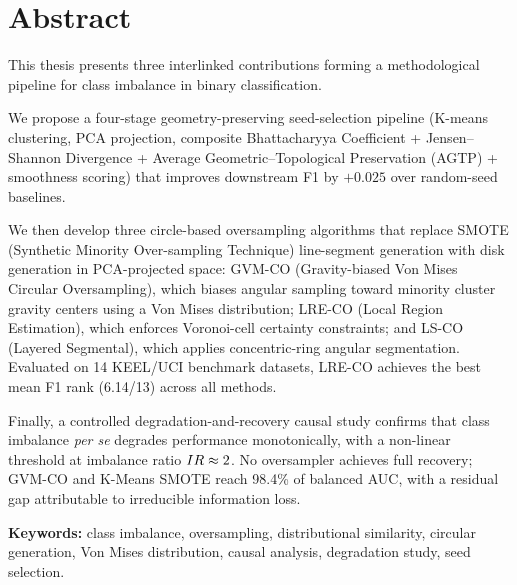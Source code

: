 \chapter*{Abstract}

This thesis presents three interlinked contributions forming a methodological pipeline for class imbalance in binary classification.

\medskip\noindent
We propose a four-stage geometry-preserving seed-selection pipeline (K-means clustering, PCA projection, composite Bhattacharyya Coefficient + Jensen--Shannon Divergence + Average Geometric--Topological Preservation (AGTP) + smoothness scoring) that improves downstream F1 by $+0.025$ over random-seed baselines.

\medskip\noindent
We then develop three circle-based oversampling algorithms that replace SMOTE (Synthetic Minority Over-sampling Technique) line-segment generation with disk generation in PCA-projected space: GVM-CO (Gravity-biased Von Mises Circular Oversampling), which biases angular sampling toward minority cluster gravity centers using a Von Mises distribution; LRE-CO (Local Region Estimation), which enforces Voronoi-cell certainty constraints; and LS-CO (Layered Segmental), which applies concentric-ring angular segmentation. Evaluated on 14 KEEL/UCI benchmark datasets, LRE-CO achieves the best mean F1 rank (6.14/13) across all methods.

\medskip\noindent
Finally, a controlled degradation-and-recovery causal study confirms that class imbalance \emph{per se} degrades performance monotonically, with a non-linear threshold at imbalance ratio $IR \approx 2$. No oversampler achieves full recovery; GVM-CO and K-Means SMOTE reach 98.4\% of balanced AUC, with a residual gap attributable to irreducible information loss.

\medskip

\noindent\textbf{Keywords:} class imbalance, oversampling, distributional similarity, circular generation, Von Mises distribution, causal analysis, degradation study, seed selection.
